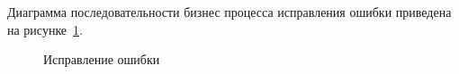 Диаграмма последовательности бизнес процесса исправления ошибки приведена на рисунке~\ref{fig:sequenceReport}.
\begin{figure}[h]
	\caption{Исправление ошибки}
	\label{fig:sequenceReport}
\end{figure}